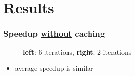 \documentclass{beamer}
\begin{document}
\section{Results}
\begin{frame}
  \frametitle{Speedup \underline{without} caching}
  \begin{figure}
    \centering
      \caption{\textbf{left}: 6 iterations, \textbf{right}: 2 iterations}
  \end{figure}
  
  \begin{itemize}
    \item average speedup is similar
  \end{itemize}
\end{frame}
\end{document}
